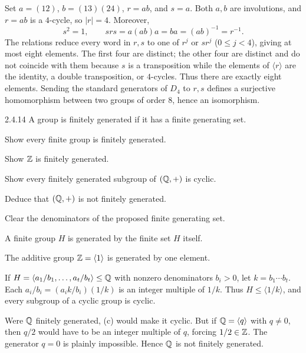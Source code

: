 \documentclass[11pt,oneside]{article}
\begin{document}
\begin{solution}
Set $a=(12)$, $b=(13)(24)$, $r=ab$, and $s=a$. Both $a,b$ are involutions, and $r=ab$ is a $4$-cycle, so $|r|=4$. Moreover,
\[
 s^2=1,\qquad srs=a(ab)a=ba=(ab)^{-1}=r^{-1}.
\]
The relations reduce every word in $r,s$ to one of $r^j$ or $sr^j$ ($0\le j<4$), giving at most eight elements. The first four are distinct; the other four are distinct and do not coincide with them because $s$ is a transposition while the elements of $\langle r\rangle$ are the identity, a double transposition, or $4$-cycles. Thus there are exactly eight elements. Sending the standard generators of $D_4$ to $r,s$ defines a surjective homomorphism between two groups of order $8$, hence an isomorphism.
\end{solution}

\begin{exercise}{2.4.14}
A group is finitely generated if it has a finite generating set.
\begin{exercisesubparts}
\item Show every finite group is finitely generated.
\item Show $\mathbb{Z}$ is finitely generated.
\item Show every finitely generated subgroup of $(\mathbb{Q},+)$ is cyclic.
\item Deduce that $(\mathbb{Q},+)$ is not finitely generated.
\end{exercisesubparts}
\end{exercise}

\begin{hint}
Clear the denominators of the proposed finite generating set.
\end{hint}

\begin{solution}
\begin{exercisesubparts}
\item A finite group $H$ is generated by the finite set $H$ itself.
\item The additive group $\mathbb{Z}=\langle1\rangle$ is generated by one element.
\item If $H=\langle a_1/b_1,\ldots,a_t/b_t\rangle\le\mathbb{Q}$ with nonzero denominators $b_i>0$, let $k=b_1\cdots b_t$. Each $a_i/b_i=(a_i k/b_i)(1/k)$ is an integer multiple of $1/k$. Thus $H\le\langle1/k\rangle$, and every subgroup of a cyclic group is cyclic.
\item Were $\mathbb{Q}$ finitely generated, (c) would make it cyclic. But if $\mathbb{Q}=\langle q\rangle$ with $q\ne0$, then $q/2$ would have to be an integer multiple of $q$, forcing $1/2\in\mathbb{Z}$. The generator $q=0$ is plainly impossible. Hence $\mathbb{Q}$ is not finitely generated.
\end{exercisesubparts}
\end{solution}
\end{document}
